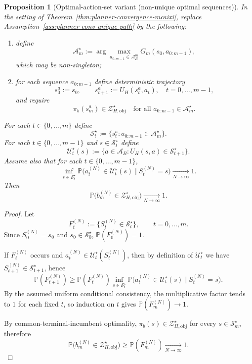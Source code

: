 \documentclass[11pt]{article}
\newtheorem{proposition}{Proposition}
\begin{document}
\begin{proposition}[Optimal-action-set variant (non-unique optimal sequences)]\label{prop:planner-convergence-optset}
In the setting of Theorem~\ref{thm:planner-convergence-mcaixi}, replace
Assumption~\ref{ass:planner-conv-unique-path} by the following:
\begin{enumerate}
    \item define
    \[
    \mathcal{A}_m^{\star}:=
    \arg\max_{a_{0:m-1}\in\mathcal{A}_B^m}G_m(s_0,a_{0:m-1}),
    \]
    which may be non-singleton;
    \item for each sequence $a_{0:m-1}$ define deterministic trajectory
    \[
    s_0^{a}:=s_0,
    \qquad
    s_{t+1}^{a}:=U_H(s_t^{a},a_t),
    \quad t=0,\dots,m-1,
    \]
    and require
    \[
    \pi_b(s_m^{a})\in\mathcal{Z}_{H,\mathrm{obj}}^{\star}
    \quad\text{for all }a_{0:m-1}\in\mathcal{A}_m^{\star}.
    \]
\end{enumerate}
For each $t\in\{0,\dots,m\}$ define
\[
\mathcal{S}_t^{\star}:=\{s_t^{a}:a_{0:m-1}\in\mathcal{A}_m^{\star}\}.
\]
For each $t\in\{0,\dots,m-1\}$ and $s\in\mathcal{S}_t^{\star}$ define
\[
\mathcal{U}_t^{\star}(s):=\{a\in\mathcal{A}_B:U_H(s,a)\in\mathcal{S}_{t+1}^{\star}\}.
\]
Assume also that for each $t\in\{0,\dots,m-1\}$,
\[
\inf_{s\in\mathcal{S}_t^{\star}}
\mathbb{P}\!\big(a_t^{(N)}\in\mathcal{U}_t^{\star}(s)\mid S_t^{(N)}=s\big)
\xrightarrow[N\to\infty]{}1.
\]
Then
\[
\mathbb{P}\!\big(b_m^{(N)}\in\mathcal{Z}_{H,\mathrm{obj}}^{\star}\big)
\xrightarrow[N\to\infty]{}1.
\]
\end{proposition}

\begin{proof}
Let
\[
F_t^{(N)}:=\{S_t^{(N)}\in\mathcal{S}_t^{\star}\},
\qquad t=0,\dots,m.
\]
Since $S_0^{(N)}=s_0$ and $s_0\in\mathcal{S}_0^{\star}$,
$\mathbb{P}(F_0^{(N)})=1$.

If $F_t^{(N)}$ occurs and
$a_t^{(N)}\in\mathcal{U}_t^{\star}(S_t^{(N)})$, then by definition of
$\mathcal{U}_t^{\star}$ we have $S_{t+1}^{(N)}\in\mathcal{S}_{t+1}^{\star}$,
hence
\[
\mathbb{P}(F_{t+1}^{(N)})
\ge
\mathbb{P}(F_t^{(N)})
\inf_{s\in\mathcal{S}_t^{\star}}
\mathbb{P}\!\big(a_t^{(N)}\in\mathcal{U}_t^{\star}(s)\mid S_t^{(N)}=s\big).
\]
By the assumed uniform conditional consistency, the multiplicative factor tends
to $1$ for each fixed $t$, so induction on $t$ gives
$\mathbb{P}(F_m^{(N)})\to 1$.

By common-terminal-incumbent optimality,
$\pi_b(s)\in\mathcal{Z}_{H,\mathrm{obj}}^{\star}$ for every
$s\in\mathcal{S}_m^{\star}$, therefore
\[
\mathbb{P}\!\big(b_m^{(N)}\in\mathcal{Z}_{H,\mathrm{obj}}^{\star}\big)
\ge
\mathbb{P}(F_m^{(N)})
\xrightarrow[N\to\infty]{}1.
\]
\end{proof}
\end{document}
